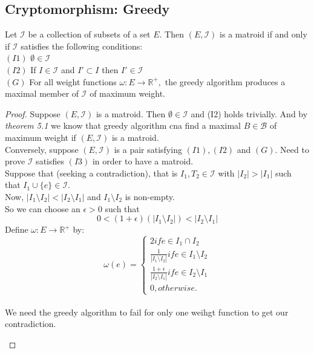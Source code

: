 \documentclass[../main.tex]{subfiles}
\begin{document}
\subsection{Cryptomorphism: Greedy}
\begin{thm}
Let $\mathcal{I}$ be a collection of subsets of a set $E.$ Then $(E,\mathcal{I})$ is a matroid if and only if $\mathcal{I}$ satisfies the following conditions:\\
$(I1)$ $\emptyset \in \mathcal{I}$\\
$(I2)$ If $I \in \mathcal{I}$ and $I' \subset I$ then $I' \in \mathcal{I}$\\
$(G)$ For all weight functions $\omega:E \longrightarrow \mathbb{R^+},$ the greedy algorithm produces a maximal member of $\mathcal{I}$ of maximum weight.
\end{thm}
\begin{proof}
Suppose $(E,\mathcal{I})$ is a matroid. Then $\emptyset \in \mathcal{I}$ and (I2) holds trivially.
And by \textit{theorem 5.1} we know that greedy algorithm cna find a maximal $B \in \mathcal{B}$ of maximum weight if $(E,\mathcal{I})$ is a matroid.\\
Conversely, suppose $(E,\mathcal{I})$ is a pair satisfying $(I1),(I2)$ and $(G).$ Need to prove $\mathcal{I}$ satisfies $(I3)$ in order to have a matroid.\\
Suppose that (seeking a contradiction), that is $I_1,T_2 \in \mathcal{I}$ with $|I_2|>|I_1|$ such that $I_1 \cup \{e\} \in \mathcal{I}.$\\
Now, $|I_1 \setminus I_2| < |I_2 \setminus I_1|$ and $I_1 \setminus I_2$ is non-empty.\\
So we can choose an $\epsilon>0$ such that
\begin{equation}
0 < (1+\epsilon)(|I_1 \setminus I_2|) < |I_2 \setminus I_1|
\end{equation}
Define $\omega:E \longrightarrow \mathbb{R^+}$ by:
\[
\omega(e) = \begin{cases}
               2 if e \in I_1 \cap I_2 \\
               \frac{1}{|I_1 \setminus I_2|} if e \in I_1 \setminus I_2\\
               \frac{1+\epsilon}{|I_2 \setminus I_1|} if e \in I_2 \setminus I_1 \\
               0, otherwise.
            \end{cases}
\]\\
We need the greedy algorithm to fail for only one weihgt function to get our contradiction.
\begin{itemize}

\end{itemize}
\end{proof}
\end{document}
